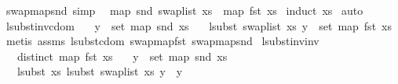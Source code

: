 \begin{isabellebody}
\isamarkupfalse%
\ swap{\isacharunderscore}{\kern0pt}map{\isacharunderscore}{\kern0pt}snd\ {\isacharbrackleft}{\kern0pt}simp{\isacharbrackright}{\kern0pt}{\isacharcolon}{\kern0pt}\isanewline
\ \ {\isachardoublequoteopen}map\ snd\ {\isacharparenleft}{\kern0pt}swap{\isacharunderscore}{\kern0pt}list\ xs{\isacharparenright}{\kern0pt}\ {\isacharequal}{\kern0pt}\ map\ fst\ xs{\isachardoublequoteclose}\isanewline
%
\isadelimproof
%
\endisadelimproof
%
\isatagproof
{}\isamarkupfalse%
\ {\isacharparenleft}{\kern0pt}induct\ xs{\isacharparenright}{\kern0pt}\isanewline
{}\isamarkupfalse%
\ auto%
\endisatagproof
{\isafoldproof}%
%
\isadelimproof
\isanewline
%
\endisadelimproof
\isanewline
\isanewline
{}\isamarkupfalse%
\ lsubst{\isacharunderscore}{\kern0pt}inv{\isacharunderscore}{\kern0pt}cdom{\isacharcolon}{\kern0pt}\isanewline
\ \ \ {\isachardoublequoteopen}y\ {\isasymin}\ set\ {\isacharparenleft}{\kern0pt}map\ snd\ xs{\isacharparenright}{\kern0pt}{\isachardoublequoteclose}\isanewline
\ \ \ {\isachardoublequoteopen}lsubst\ {\isacharparenleft}{\kern0pt}swap{\isacharunderscore}{\kern0pt}list\ xs{\isacharparenright}{\kern0pt}\ y\ {\isasymin}\ set\ {\isacharparenleft}{\kern0pt}map\ fst\ xs{\isacharparenright}{\kern0pt}{\isachardoublequoteclose}\isanewline
%
\isadelimproof
%
\endisadelimproof
%
\isatagproof
{}\isamarkupfalse%
\ {\isacharparenleft}{\kern0pt}metis\ assms\ lsubst{\isacharunderscore}{\kern0pt}cdom\ swap{\isacharunderscore}{\kern0pt}map{\isacharunderscore}{\kern0pt}fst\ swap{\isacharunderscore}{\kern0pt}map{\isacharunderscore}{\kern0pt}snd{\isacharparenright}{\kern0pt}%
\endisatagproof
{\isafoldproof}%
%
\isadelimproof
\isanewline
%
\endisadelimproof
\isanewline
\isanewline
{}\isamarkupfalse%
\ lsubst{\isacharunderscore}{\kern0pt}inv{\isacharunderscore}{\kern0pt}inv{\isacharcolon}{\kern0pt}\isanewline
\ \ \ {\isachardoublequoteopen}distinct\ {\isacharparenleft}{\kern0pt}map\ fst\ xs{\isacharparenright}{\kern0pt}{\isachardoublequoteclose}\isanewline
\ \ \ {\isachardoublequoteopen}y\ {\isasymin}\ set\ {\isacharparenleft}{\kern0pt}map\ snd\ xs{\isacharparenright}{\kern0pt}{\isachardoublequoteclose}\isanewline
\ \ \ {\isachardoublequoteopen}lsubst\ xs\ {\isacharparenleft}{\kern0pt}lsubst\ {\isacharparenleft}{\kern0pt}swap{\isacharunderscore}{\kern0pt}list\ xs{\isacharparenright}{\kern0pt}\ y{\isacharparenright}{\kern0pt}\ {\isacharequal}{\kern0pt}\ y{\isachardoublequoteclose}\isanewline

\end{isabellebody}
